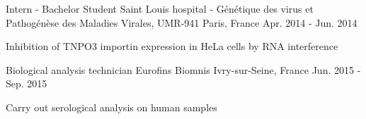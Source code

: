 \begin{cventries}
  \cventry
    {Intern - Bachelor Student} %
    {Saint Louis hospital - Génétique des virus et Pathogénèse des Maladies Virales, UMR-941} %
    {Paris, France} %
    {Apr. 2014 - Jun. 2014} %
    {
      \begin{cvitems} %
        \item {Inhibition of TNPO3 importin expression in HeLa cells by RNA interference}
      \end{cvitems}
    }

  \cventry
    {Biological analysis technician} %
    {Eurofins Biomnis} %
    {Ivry-sur-Seine, France} %
    {Jun. 2015 - Sep. 2015} %
    {
      \begin{cvitems} %
        \item {Carry out serological analysis on human samples}
      \end{cvitems}
    }
\end{cventries}
